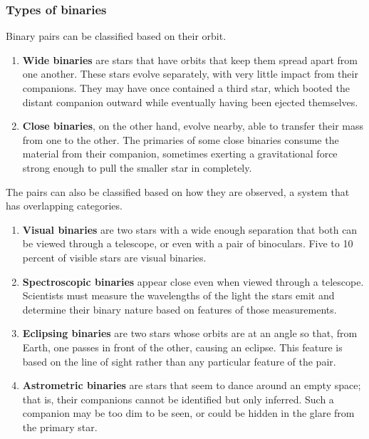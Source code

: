 \documentclass{article}
\begin{document}
\subsubsection{Types of binaries}
Binary pairs can be classified based on their orbit.
\begin{enumerate}
    \item \textbf{Wide binaries} are stars that have orbits that keep them spread apart from one another. These stars evolve separately, with very little impact from their companions. They may have once contained a third star, which booted the distant companion outward while eventually having been ejected themselves.
    
    \item \textbf{Close binaries}, on the other hand, evolve nearby, able to transfer their mass from one to the other. The primaries of some close binaries consume the material from their companion, sometimes exerting a gravitational force strong enough to pull the smaller star in completely.
\end{enumerate}
The pairs can also be classified based on how they are observed, a system that has overlapping categories.
\begin{enumerate}
    \item \textbf{Visual binaries} are two stars with a wide enough separation that both can be viewed through a telescope, or even with a pair of binoculars. Five to 10 percent of visible stars are visual binaries.
    \item \textbf{Spectroscopic binaries} appear close even when viewed through a telescope. Scientists must measure the wavelengths of the light the stars emit and determine their binary nature based on features of those measurements.
    \item \textbf{Eclipsing binaries} are two stars whose orbits are at an angle so that, from Earth, one passes in front of the other, causing an eclipse. This feature is based on the line of sight rather than any particular feature of the pair.
    \item \textbf{Astrometric binaries} are stars that seem to dance around an empty space; that is, their companions cannot be identified but only inferred. Such a companion may be too dim to be seen, or could be hidden in the glare from the primary star.
\end{enumerate}
\end{document}
